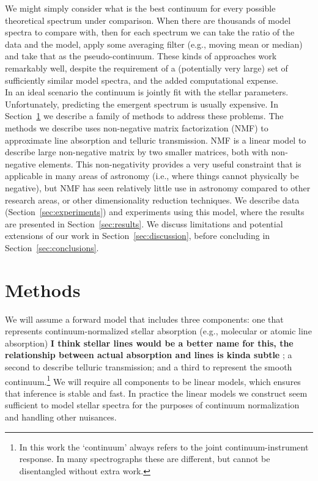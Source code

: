 \documentclass[modern]{aastex631}
\newcommand{\ajw}[1]{\textbf{#1}}
\begin{document}
We might simply consider what is the best continuum for every possible theoretical spectrum under comparison. When there are thousands of model spectra to compare with, then for each spectrum we can take the ratio of the data and the model, apply some averaging filter (e.g., moving mean or median) and take that as the pseudo-continuum. These kinds of approaches work remarkably well, despite the requirement of a (potentially very large) set of sufficiently similar model spectra, and the added computational expense.\\


In an ideal scenario the continuum is jointly fit with the stellar parameters. Unfortunately, predicting the emergent spectrum is usually expensive. In Section~\ref{sec:methods} we describe a family of methods to address these problems.
The methods we describe uses non-negative matrix factorization (NMF) to approximate line absorption and telluric transmission. NMF is a linear model to describe large non-negative matrix by two smaller matrices, both with non-negative elements. This non-negativity provides a very useful constraint that is applicable in many areas of astronomy (i.e., where things cannot physically be negative), but NMF has seen relatively little use in astronomy compared to other research areas, or other dimensionality reduction techniques. 
We describe data (Section~\ref{sec:experiments}) and experiments using this model, where the results are presented in Section~\ref{sec:results}. We discuss limitations and potential extensions of our work in Section~\ref{sec:discussion}, before concluding in Section~\ref{sec:conclusions}.\\



\section{Methods}\label{sec:methods}

We will assume a forward model that includes three components: one that represents continuum-normalized stellar absorption (e.g., molecular or atomic line absorption) \ajw{I think stellar lines   would be a better name for this, the relationship between actual absorption and lines is kinda subtle }; a second to describe telluric transmission; and a third to represent the smooth continuum.\footnote{In this work the `continuum' always refers to the joint continuum-instrument response. In many spectrographs these are different, but cannot be disentangled without extra work.} We will require all components to be linear models, which ensures that inference is stable and fast. In practice the linear models we construct seem sufficient to model stellar spectra for the purposes of continuum normalization and handling other nuisances.\\
\end{document}
